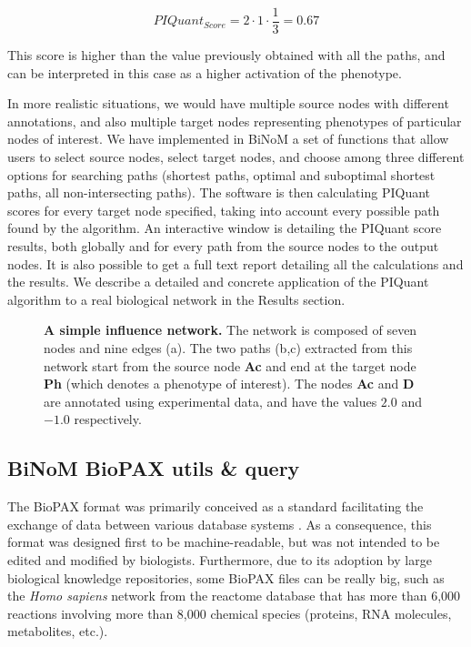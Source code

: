\documentclass[10pt]{bmc_article}
\newenvironment{bmcformat}{\baselineskip20pt\sloppy\setboolean{publ}{false}}{\baselineskip20pt\sloppy}
\begin{document}
\begin{bmcformat}
$$
 PIQuant_{Score} = 2 \cdot 1 \cdot \frac{1}{3} = 0.67
$$

This score is higher than the value previously obtained with all the paths, and can be interpreted in this case as a higher activation of the phenotype.

In more realistic situations, we would have multiple source nodes with different
 annotations, and also multiple target nodes representing phenotypes of
particular nodes of interest. We have implemented in BiNoM a set of functions
that allow users to select source nodes, select target nodes, and choose among
three different options for searching paths (shortest paths, optimal and
suboptimal shortest paths, all non-intersecting paths). The software is then
calculating PIQuant scores for every target node specified, taking into account
every possible path found by the algorithm. An interactive window is detailing
the PIQuant score results, both globally and for every path from the source
nodes to the output nodes. It is also possible to get a full text report
detailing all the calculations and the results. We describe a detailed
and concrete application of the PIQuant algorithm to a real biological network
in the Results section.

\begin{figure}[h]
 \caption{\label{piquantnetworks}  \textbf{A simple influence network.} The
network is composed of seven nodes and nine edges (a). The two paths (b,c)
extracted from this network start from the source node \textbf{Ac} and end at
the target node \textbf{Ph} (which denotes a phenotype of interest). The nodes
\textbf{Ac} and \textbf{D} are annotated using experimental data, and have the
values $2.0$ and $-1.0$ respectively.}
\end{figure}

\subsection*{BiNoM BioPAX utils \& query}
The BioPAX format was primarily conceived as a standard facilitating the
exchange of data between various database systems \cite{demir2010biopax}. As a
consequence, this format was designed first to be machine-readable, but was not
intended
to be edited and modified by biologists. Furthermore, due to its adoption by
large biological knowledge repositories, some BioPAX files can be really big,
such as the \textit{Homo sapiens} network from the reactome database
\cite{joshi2005reactome} that has more than 6,000 reactions involving more than
8,000 chemical species (proteins, RNA molecules, metabolites, etc.).


\end{bmcformat}
\end{document}
